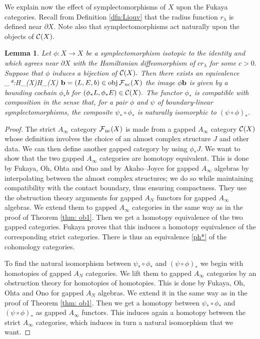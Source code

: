 \documentclass{article}
\theoremstyle{plain}%
\newtheorem{lem}[thm]{Lemma}
\theoremstyle{definition}
\numberwithin{equation}{section}
\numberwithin{figure}{section}
\def\e#1\e{\begin{equation}#1\end{equation}}
\def\eq{\eqref}
\def\l{\label}
\def\cC{{\mathbin{\cal C}}}
\def\cF{{\mathbin{\cal F}}}
\def\la{\lambda}
\def\ph{\phi}
\def\ps{\psi}
\def\d{{\partial}}
\def\iy{\infty}
\begin{document}
We explain now the effect of symplectomorphisms of $X$ upon the Fukaya categories.
Recall from Definition \ref{dfn:Liouv} that the radius function $r_\la$ is defined near $\d X.$
Note also that symplectomorphisms act naturally upon the objects of $\cC(X).$
\begin{lem}\l{lem: continuation}
Let $\ph:X\to X$ be a symplectomorphism isotopic to the identity and which agrees near $\d X$ with the Hamiltonian diffeomorphism of $cr_\la$ for some $c>0.$
Suppose that $\ph$ induces a bijection of $\cC(X).$
Then there exists an equivalence
\e\l{ph*}\ph_*:H\cF_\nc(X)\to H\cF_\nc(X)\e
such that for every $\b=(L,E,b)\in \obj\cF_\nc(X)$ the image $\ph\b$ is given by a bounding cochain $\ph_*b$ for $(\ph_*L,\ph_*E)\in\cC(X).$
The functor $\ph_* $  is compatible with composition in the sense that, for a pair $\ph$ and $\ps$ of boundary-linear symplectomorphisms, 
the composite $\ps_* \circ \ph_*$ is naturally isomorphic to $(\ps\circ\ph)_*.$
\end{lem}
\begin{proof}
The strict $A_\iy$ category $\cF_\nc(X)$ is made from a gapped $A_\iy$ category $\cC(X)$ whose definition involves the choice of an almost complex structure $J$ and other data.
We can then define another gapped category by using $\ph_*J.$
We want to show that the two gapped $A_\iy$ categories are homotopy equivalent. This is done by Fukaya, Oh, Ohta and Ono \cite[Theorem A]{FOOO} and by Akaho--Joyce \cite[Theorem 11.2(a)]{AJ} for gapped $A_\iy$ algebras by interpolating between the almost complex structures;  we do so while maintaining compatibility with the contact boundary, thus ensuring compactness. 
They use the obstruction theory arguments for gapped $A_N$ functors \cite[Lemma 7.2.129]{FOOO} for gapped $A_\iy$ algebras. We extend them to gapped $A_\iy$ categories in the same way as in the proof of Theorem \ref{thm: ob1}. 
Then we get a homotopy equivalence of the two gapped categories.
Fukaya \cite[Proposition 13.18]{Fuk} proves that this induces a homotopy equivalence of the corresponding strict categories.
There is thus an equivalence \eq{ph*} of the cohomology categories. 

To find the natural isomorphism between $\ps_* \circ \ph_*$ and $(\ps\circ\ph)_*$ we begin with  homotopies of gapped $A_N$ categories. We lift them to gapped $A_\iy$ categories by an obstruction theory for homotopies of homotopies. This is done by Fukaya, Oh, Ohta and Ono \cite[Corollary 7.2.219]{FOOO} for gapped $A_N$ algebras. We extend it in the same way as in the proof of Theorem \ref{thm: ob1}. Then we get a homotopy between  $\ps_* \circ \ph_*$ and $(\ps\circ\ph)_*$ as gapped $A_\iy$ functors. This induces again a homotopy between the strict $A_\iy$ categories, which induces in turn a natural isomorphism that we want.
\end{proof}
\end{document}
